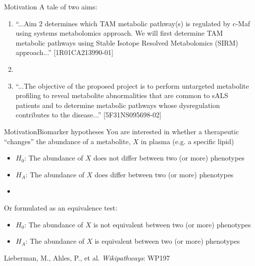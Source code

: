 \documentclass[xcolor=dvipsnames]{beamer}
\begin{document}
\begin{frame}{Motivation}
	\vspace{-10pt}
		{\LARGE A tale of two aims:}
		
		\begin{enumerate}[{1)}]
			\item ``...Aim 2 determines which TAM metabolic pathway(s) is regulated by c-Maf using systems metabolomics approach. We will first determine TAM metabolic pathways using Stable Isotope Resolved Metabolomics (SIRM) approach...'' [1R01CA213990-01]
			\item[]
			\item ``...The objective of the proposed project is to perform untargeted metabolite profiling to reveal metabolite abnormalities that are common to sALS patients and to determine metabolic pathways whose dysregulation contributes to the disease...'' [5F31NS095698-02]
		\end{enumerate}
\end{frame}

\begin{frame}{Motivation}{Biomarker hypotheses}
	\vspace{-10pt}
	You are interested in whether a therapeutic ``changes'' the abundance of a metabolite, $X$ in plasma (e.g. a specific lipid)
	\begin{itemize}
		\item $H_0$: The abundance of $X$ does not differ between two (or more) phenotypes 
		\item $H_A$: The abundance of $X$ does differ between two (or more) phenotypes 
		\item[]
	\end{itemize} 
	
	Or formulated as an equivalence test:
	\begin{itemize}
		\item $H_0$: The abundance of $X$ is not equivalent between two (or more) phenotypes  
		\item $H_A$: The abundance of $X$ is equivalent between two (or more) phenotypes  
	\end{itemize}
\end{frame}

\begin{frame}
	\begin{center}
			
			Lieberman, M., Ahles, P., et al. \emph{Wikipathways}: WP197
	\end{center}
\end{frame}
\end{document}
